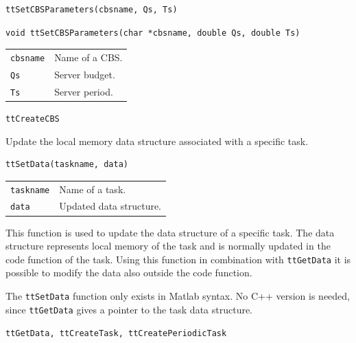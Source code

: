 \documentclass[final,twoside]{rapport}
\begin{document}
\Msyntax
\begin{verbatim}
ttSetCBSParameters(cbsname, Qs, Ts)
\end{verbatim}

\Csyntax
\begin{verbatim}
void ttSetCBSParameters(char *cbsname, double Qs, double Ts)
\end{verbatim}

\args
\begin{tabularx}{\hsize}{l>{\raggedright\arraybackslash}X}
  {\tt cbsname} & Name of a CBS. \\
  {\tt Qs} & Server budget. \\
  {\tt Ts} & Server period. \\
\end{tabularx}

\descr 

\seealso
\texttt{ttCreateCBS}



\purpose
Update the local memory data structure associated with a specific task.

\Msyntax
\begin{verbatim}
ttSetData(taskname, data)
\end{verbatim}

\args
\begin{tabularx}{\hsize}{l>{\raggedright\arraybackslash}X}
  {\tt taskname} & Name of a task. \\
  {\tt data} & Updated data structure. \\
\end{tabularx}

\descr This function is used to update the data structure of a
specific task. The data structure represents local memory of the task
and is normally updated in the code function of the task. Using this
function in combination with \texttt{ttGetData} it is possible to
modify the data also outside the code function.

The \texttt{ttSetData} function only exists in Matlab syntax. No C++
version is needed, since \texttt{ttGetData} gives a pointer to the
task data structure.

\seealso
\texttt{ttGetData, ttCreateTask, ttCreatePeriodicTask}


\end{document}
